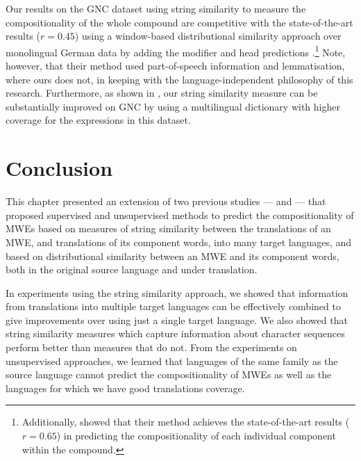 \documentclass[output=paper
,modfonts
,nonflat]{langsci/langscibook}
\begin{document}
Our results on the GNC dataset using string similarity to measure the
compositionality of the whole compound are competitive with the
state-of-the-art results ($r = 0.45$) using a window-based
distributional similarity approach over monolingual German data by
adding the modifier and head predictions
\citep{SchulteImWalde+:2013}.\footnote{Additionally,
  \cite{SchulteImWalde+:2013} showed that their method achieves the
  state-of-the-art results ($r = 0.65$) in predicting the
  compositionality of each individual component within the compound.}
Note, however, that their method used part-of-speech information and
lemmatisation, where ours does not, in keeping with the
language-independent philosophy of this research. Furthermore, as
shown in , our string similarity measure can be
substantially improved on GNC by using a multilingual dictionary with
higher coverage for the expressions in this dataset.





\section{Conclusion}




This chapter presented an extension of two previous studies ---
\cite{salehi2013} and \cite{DBLP:conf/eacl/SalehiCB14} --- that
proposed supervised and unsupervised methods to predict the
compositionality of MWEs based on measures of string similarity
between the translations of an MWE, and translations of its component
words, into many target languages, and based on distributional
similarity between an MWE and its component words, both in the
original source language and under translation.

In experiments using the string similarity approach, we showed that
information from translations into multiple target languages can be
effectively combined to give improvements over using just a single
target language. We also showed that string similarity measures which
capture information about character sequences perform better than
measures that do not. From the experiments on unsupervised approaches,
we learned that languages of the same family as the source language
cannot predict the compositionality of MWEs as well as the languages
for which we have good translations coverage.
\end{document}
